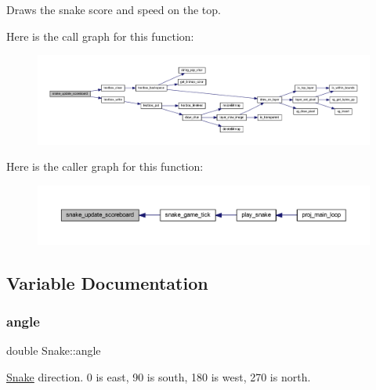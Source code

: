 Draws the snake score and speed on the top. 

Here is the call graph for this function\+:\nopagebreak
\begin{figure}[H]
\begin{center}
\leavevmode
\includegraphics[width=350pt]{group__snake_ga62eda6f8af6d324996f0a633f543e45f_cgraph}
\end{center}
\end{figure}
Here is the caller graph for this function\+:\nopagebreak
\begin{figure}[H]
\begin{center}
\leavevmode
\includegraphics[width=350pt]{group__snake_ga62eda6f8af6d324996f0a633f543e45f_icgraph}
\end{center}
\end{figure}


\subsection{Variable Documentation}
\mbox{\label{group__snake_ga74c9d3c783fec83cb7efbdd228821fe7}} 
\subsubsection{\texorpdfstring{angle}{angle}\hspace{0.1cm}{\footnotesize\ttfamily [1/2]}}
{\footnotesize\ttfamily double Snake\+::angle}



\mbox{\hyperlink{struct_snake}{Snake}} direction. 0 is east, 90 is south, 180 is west, 270 is north. 

\mbox{\label{group__snake_ga24389f11de2d62dfff3e4357053e0083}} 
